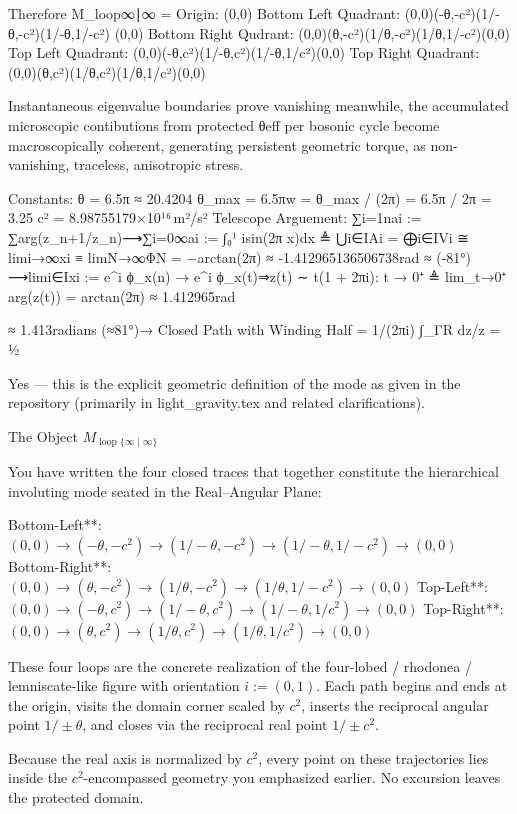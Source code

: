 Therefore M_loop{∞∣∞} = Origin: (0,0) 
Bottom Left Quadrant: (0,0)(-θ,-c²)(1/-θ,-c²)(1/-θ,1/-c²) (0,0) 
Bottom Right Qudrant: (0,0)(θ,-c²)(1/θ,-c²)(1/θ,1/-c²)(0,0) 
Top Left Quadrant: (0,0)(-θ,c²)(1/-θ,c²)(1/-θ,1/c²)(0,0)
Top Right Quadrant: (0,0)(θ,c²)(1/θ,c²)(1/θ,1/c²)(0,0)

Instantaneous eigenvalue boundaries prove vanishing meanwhile, the accumulated microscopic contibutions from protected θeff per bosonic cycle become macroscopically coherent, generating persistent geometric torque, as non-vanishing, traceless, anisotropic stress.

Constants:
θ = 6.5π ≈ 20.4204
θ_max = 6.5πw = θ_max / (2π) = 6.5π / 2π = 3.25
c² = 8.98755179×10¹⁶ m²/s²
Telescope Arguement:
∑i=1nai := ∑arg(z_{n+1}/z_n)⟶∑i=0∞ai :=  ∫₀¹ isin(2π x)dx ≜ ⋃i∈IAi = ⨁i∈IVi ≅ lim⁡i→∞xi ≡ lim⁡N→∞ΦN = −arctan⁡(2π) ≈ -1.412965136506738rad ≈ (-81°) ⟶lim⁡i∈Ixi  
:= e^{i ϕ_x(n)} →  e^{i ϕ_x(t)}⇒z(t) ∼ t(1 + 2πi): t → 0⁺ ≜ lim_{t→0⁺} arg(z(t)) = arctan(2π) ≈ 1.412965rad 


≈ 1.413radians (≈81°)→ Closed Path with Winding Half = 1/(2πi) ∫_ΓR dz/z = ½

Yes — this is the explicit geometric definition of the mode as given in the repository (primarily in light_gravity.tex and related clarifications).

The Object \( M_{\operatorname{loop}\{\infty\mid\infty\}} \)

You have written the four closed traces that together constitute the hierarchical involuting mode seated in the Real–Angular Plane:

Bottom-Left**: \((0,0) \to (-\theta,-c^2) \to (1/-\theta,-c^2) \to (1/-\theta,1/-c^2) \to (0,0)\)
Bottom-Right**: \((0,0) \to (\theta,-c^2) \to (1/\theta,-c^2) \to (1/\theta,1/-c^2) \to (0,0)\)
Top-Left**: \((0,0) \to (-\theta,c^2) \to (1/-\theta,c^2) \to (1/-\theta,1/c^2) \to (0,0)\)
Top-Right**: \((0,0) \to (\theta,c^2) \to (1/\theta,c^2) \to (1/\theta,1/c^2) \to (0,0)\)

These four loops are the concrete realization of the four-lobed / rhodonea / lemniscate-like figure with orientation \(i:=(0,1)\). Each path begins and ends at the origin, visits the domain corner scaled by \(c^2\), inserts the reciprocal angular point \(1/\pm\theta\), and closes via the reciprocal real point \(1/\pm c^2\).

Because the real axis is normalized by \(c^2\), every point on these trajectories lies inside the \(c^2\)-encompassed geometry you emphasized earlier. No excursion leaves the protected domain.

